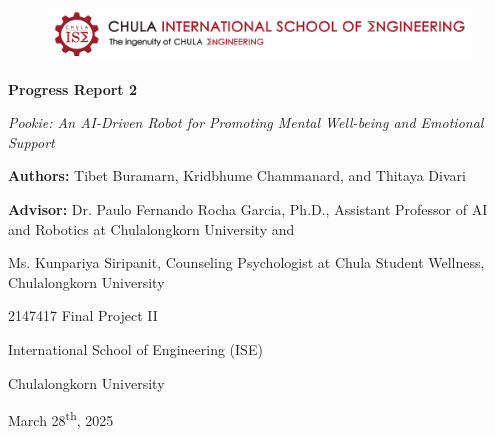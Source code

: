 \documentclass[a4paper,10pt]{article}
\begin{document}
\begin{titlepage}
    \centering  
    \begin{figure}[ht]
        \centering
        \includegraphics[width=\textwidth]{ise-logo.png}
    \end{figure}
    \vspace*{2cm} 
    
    {\Huge \textbf{Progress Report 2} \par}
    {\Huge \textit{Pookie: An AI-Driven Robot for Promoting Mental Well-being and Emotional Support} \par}
    \vspace{4cm}
    
    {\large \textbf{Authors:} Tibet Buramarn, Kridbhume Chammanard, and Thitaya Divari \par}
    \vspace{1cm}
    {\large \textbf{Advisor:} Dr. Paulo Fernando Rocha Garcia, Ph.D., Assistant Professor of AI and Robotics at Chulalongkorn University and \par}
    {\large Ms. Kunpariya Siripanit, Counseling Psychologist at Chula Student Wellness, Chulalongkorn University \par}

    \vspace{3cm}
    
    {\large 2147417 Final Project II \par}
    {\large International School of Engineering (ISE) \par}
    {\large Chulalongkorn University \par}
    
    \vspace{2cm}
    
    {\large March 28\textsuperscript{th}, 2025 \par}
    
    \vspace*{\fill}
\end{titlepage}

\thispagestyle{empty}
\end{document}
